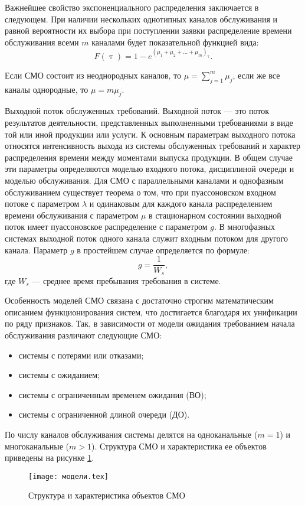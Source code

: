 Важнейшее свойство экспоненциального распределения заключается в следующем. При наличии нескольких однотипных каналов обслуживания и равной вероятности их выбора при поступлении заявки распределение времени обслуживания всеми $m$ каналами будет показательной функцией вида:
\[F(\uptau) = 1-e^{(\mu_1 +\mu_2 + ... + \mu_m)_{\uptau}}.\]

Если СМО состоит из неоднородных каналов, то $\mu = \sum\limits_{j=1}^m\mu_j$, если же все каналы однородные, то $\mu = m \mu_j$.

Выходной поток обслуженных требований. Выходной поток — это поток результатов деятельности, представленных выполненными требованиями в виде той или иной продукции или услуги. К основным параметрам выходного потока относятся интенсивность выхода из системы обслуженных требований и характер распределения времени между моментами выпуска продукции. В общем случае эти параметры определяются моделью входного потока, дисциплиной очереди и моделью обслуживания. Для СМО с параллельными каналами и однофазным обслуживанием существует теорема о том, что при пуассоновском входном потоке с параметром $\lambda$ и одинаковым для каждого канала распределением времени обслуживания с параметром $\mu$ в стационарном состоянии выходной поток имеет пуассоновское распределение с параметром $g$. В многофазных системах выходной поток одного канала служит входным потоком для другого канала. Параметр $g$ в простейшем случае определяется по формуле:
\[g=\dfrac{1}{W_s},\]
где $W_s$ --- среднее время пребывания требования в системе.

Особенность моделей СМО связана с достаточно строгим математическим описанием функционирования систем, что достигается благодаря их унификации по ряду признаков. Так, в зависимости от модели ожидания требованием начала обслуживания различают следующие СМО:
\begin{itemize}
	\item системы с потерями или отказами;
	\item системы с ожиданием;
	\item системы с ограниченным временем ожидания (ВО);
\item системы с ограниченной длиной очереди (ДО).
\end{itemize}

По числу каналов обслуживания системы делятся на одноканальные ($m = 1$) и многоканальные ($m > 1$). Структура СМО и характеристика ее объектов приведены на рисунке \ref{fig:}.

\begin{figure}
	\centering
	\texttt{[image: модели.tex]}
	\caption{Структура и характеристика объектов СМО}
	\label{fig:}
\end{figure}


